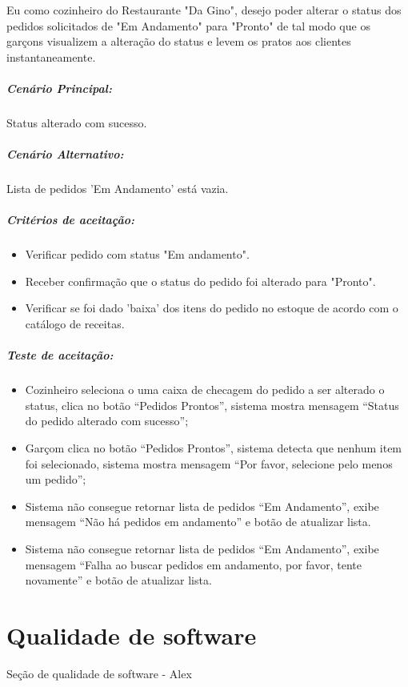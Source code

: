 Eu como cozinheiro do Restaurante "Da Gino", desejo poder alterar o status dos pedidos solicitados de "Em Andamento" para "Pronto" de tal modo que os garçons visualizem a alteração do status e levem os pratos aos clientes instantaneamente.

\subparagraph{Cenário Principal:}

Status alterado com sucesso.

\subparagraph{Cenário Alternativo:}

Lista de pedidos 'Em Andamento' está vazia.

\subparagraph{Critérios de aceitação:}

\begin{itemize}
\item Verificar pedido com status "Em andamento".
\item Receber confirmação que o status do pedido foi alterado para "Pronto".
\item Verificar se foi dado 'baixa' dos itens do pedido no estoque de acordo com o catálogo de receitas.

\end{itemize}

\subparagraph{Teste de aceitação:}

\begin{itemize}
  \item Cozinheiro seleciona o uma caixa de checagem do pedido a ser alterado o status, clica no botão “Pedidos Prontos”, sistema mostra mensagem “Status do pedido alterado com sucesso”;
\item Garçom clica no botão “Pedidos Prontos”, sistema detecta que nenhum item foi selecionado, sistema mostra mensagem “Por favor, selecione pelo menos um pedido”;
\item Sistema não consegue retornar lista de pedidos “Em Andamento”, exibe mensagem “Não há pedidos em andamento” e botão de atualizar lista.
\item Sistema não consegue retornar lista de pedidos “Em Andamento”, exibe mensagem “Falha ao buscar pedidos em andamento, por favor, tente novamente” e botão de atualizar lista.

\end{itemize}

\section{Qualidade de software}
\label{sec:qualisoftware}


\large{Seção de qualidade de software - Alex}


